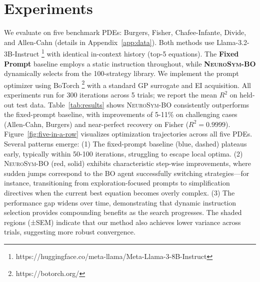 


\section{Experiments}
\label{sec:experiments}

We evaluate \ours on five benchmark PDEs: Burgers, Fisher, Chafee-Infante, Divide, and Allen-Cahn (details in Appendix~\ref{app:data}). Both methods use Llama-3.2-3B-Instruct \footnote{\small https://huggingface.co/meta-llama/Meta-Llama-3-8B-Instruct} with identical in-context history (top-5 equations). The \textbf{Fixed Prompt} baseline employs a static instruction throughout, while \textbf{\textsc{NeuroSym-BO}} dynamically selects from the 100-strategy library. We implement the prompt optimizer using BoTorch \footnote{https://botorch.org/} with a standard GP surrogate and EI acquisition. All experiments run for 300 iterations across 5 trials; we report the mean $R^2$ on held-out test data. 
Table~\ref{tab:results} shows \textsc{NeuroSym-BO} consistently outperforms the fixed-prompt baseline, with improvements of 5-11\% on challenging cases (Allen-Cahn, Burgers) and near-perfect recovery on Fisher ($R^2=0.9999$). Figure~\ref{fig:five-in-a-row} visualizes optimization trajectories across all five PDEs. Several patterns emerge: (1) The fixed-prompt baseline (blue, dashed) plateaus early, typically within 50-100 iterations, struggling to escape local optima. (2) \textsc{NeuroSym-BO} (red, solid) exhibits characteristic step-wise improvements, where sudden jumps correspond to the BO agent successfully switching strategies—for instance, transitioning from exploration-focused prompts to simplification directives when the current best equation becomes overly complex. (3) The performance gap widens over time, demonstrating that dynamic instruction selection provides compounding benefits as the search progresses. The shaded regions (±SEM) indicate that our method also achieves lower variance across trials, suggesting more robust convergence.

